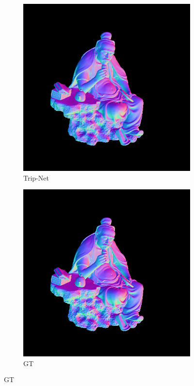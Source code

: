 \begin{figure}[th]
	\centering
	\captionsetup{width=\linewidth}
	\begin{subfigure}[b]{0.48\linewidth}
		\includegraphics[width=\linewidth]{./Figures/comparison_512/fancy_eval_11_normal_Trip-Net-512.png}
		\caption{Trip-Net}
	\end{subfigure}
	\begin{subfigure}[b]{0.48\linewidth}
		\includegraphics[width=\linewidth]{./Figures/comparison_512/fancy_eval_11_groundtruth.png}
		\caption{GT}
	\end{subfigure}
	

\end{figure}
